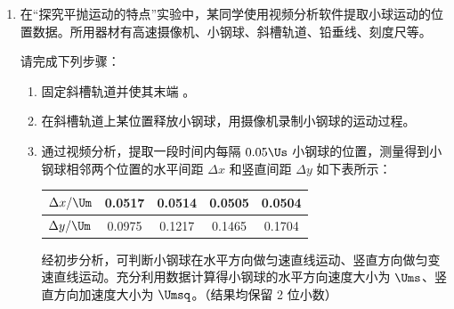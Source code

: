\documentclass[\gkver]{gaokaozhenti}
\begin{document}
\begin{enumerate}
{故选 AC。
}

\item
在“探究平抛运动的特点”实验中，某同学使用视频分析软件提取小球运动的位置数据。所用器材有高速摄像机、小钢球、斜槽轨道、铅垂线、刻度尺等。

请完成下列步骤：

\begin{enumerate}
\item
固定斜槽轨道并使其末端 。

\item
在斜槽轨道上某位置释放小钢球，用摄像机录制小钢球的运动过程。

\item
通过视频分析，提取一段时间内每隔 $0.05 \Us$ 小钢球的位置，测量得到小钢球相邻两个位置的水平间距 $\Delta x$ 和竖直间距 $\Delta y$ 如下表所示：

\begin{center}
\begin{tabular}{|c|c|c|c|c|}
\hline
$\Delta x/\Um$ & 0.0517 & 0.0514 & 0.0505 & 0.0504 \\
\hline
$\Delta y/\Um$ & 0.0975 & 0.1217 & 0.1465 & 0.1704 \\
\hline
\end{tabular}
\end{center}

经初步分析，可判断小钢球在水平方向做匀速直线运动、竖直方向做匀变速直线运动。充分利用数据计算得小钢球的水平方向速度大小为  $\Ums$、竖直方向加速度大小为  $\Umsq$。（结果均保留 2 位小数）
\end{enumerate}

\end{enumerate}
\end{document}
